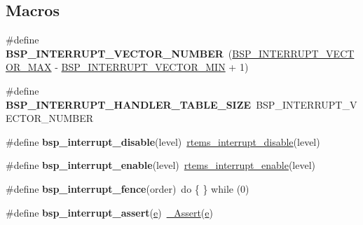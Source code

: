 \subsection*{Macros}
\begin{DoxyCompactItemize}
\item 
\mbox{\label{irq-generic_8h_aff7470b2692bbe4b21a559bc93832d7f}} 
\#define {\bfseries B\+S\+P\+\_\+\+I\+N\+T\+E\+R\+R\+U\+P\+T\+\_\+\+V\+E\+C\+T\+O\+R\+\_\+\+N\+U\+M\+B\+ER}~(\mbox{\hyperlink{group__bsp__interrupt_gae4a2cdda5816a4c83c2fac0a49880c6e}{B\+S\+P\+\_\+\+I\+N\+T\+E\+R\+R\+U\+P\+T\+\_\+\+V\+E\+C\+T\+O\+R\+\_\+\+M\+AX}} -\/ \mbox{\hyperlink{bsps_2or1k_2generic__or1k_2include_2bsp_2irq_8h_a64cbb02dfea4d6923abccaa0087d2a0d}{B\+S\+P\+\_\+\+I\+N\+T\+E\+R\+R\+U\+P\+T\+\_\+\+V\+E\+C\+T\+O\+R\+\_\+\+M\+IN}} + 1)
\item 
\mbox{\label{irq-generic_8h_a734874b8417b2811b432e796cf8bf16d}} 
\#define {\bfseries B\+S\+P\+\_\+\+I\+N\+T\+E\+R\+R\+U\+P\+T\+\_\+\+H\+A\+N\+D\+L\+E\+R\+\_\+\+T\+A\+B\+L\+E\+\_\+\+S\+I\+ZE}~B\+S\+P\+\_\+\+I\+N\+T\+E\+R\+R\+U\+P\+T\+\_\+\+V\+E\+C\+T\+O\+R\+\_\+\+N\+U\+M\+B\+ER
\item 
\mbox{\label{irq-generic_8h_af904ed7950e260b5aa1df5298192e8a3}} 
\#define {\bfseries bsp\+\_\+interrupt\+\_\+disable}(level)~\mbox{\hyperlink{group__ClassicINTR_gaf105388007be1416e810e1522cfe16e1}{rtems\+\_\+interrupt\+\_\+disable}}(level)
\item 
\mbox{\label{irq-generic_8h_a2bd880b0b7e99046bc10b536062cf066}} 
\#define {\bfseries bsp\+\_\+interrupt\+\_\+enable}(level)~\mbox{\hyperlink{group__ClassicINTR_gae4fb58b530af7eaba10c45b015282090}{rtems\+\_\+interrupt\+\_\+enable}}(level)
\item 
\mbox{\label{irq-generic_8h_a5c112c60309ef16f463e30cd93c83d4b}} 
\#define {\bfseries bsp\+\_\+interrupt\+\_\+fence}(order)~do \{ \} while (0)
\item 
\mbox{\label{irq-generic_8h_a03cb76bad4cd28017b37b899d47b84ae}} 
\#define {\bfseries bsp\+\_\+interrupt\+\_\+assert}(\mbox{\hyperlink{sun4u_2tte_8h_a8b0b9ed08e0e18920ec2682f48228c27}{e}})~\mbox{\hyperlink{group__RTEMSScoreAssert_gab823f93fcbe2a4beb27633f7df422515}{\+\_\+\+Assert}}(\mbox{\hyperlink{sun4u_2tte_8h_a8b0b9ed08e0e18920ec2682f48228c27}{e}})
\end{DoxyCompactItemize}
